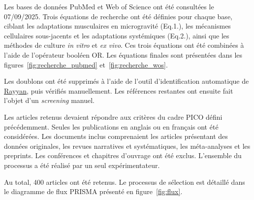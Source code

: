 \documentclass[11pt]{report}
\begin{document}
Les bases de données PubMed et Web of Science ont été consultées le 07/09/2025. Trois équations de recherche ont été définies pour chaque base, ciblant les adaptations musculaires en microgravité (Eq.1.), les mécanismes cellulaires sous-jacents et les adaptations systémiques (Eq.2.), ainsi que les méthodes de culture \textit{in vitro} et \textit{ex vivo}. Ces trois équations ont été combinées à l'aide de l'opérateur booléen OR. Les équations finales sont présentées dans les figures~\ref{fig:recherche_pubmed} et~\ref{fig:recherche_wos}.

\medskip Les doublons ont été supprimés à l'aide de l'outil d'identification automatique de \href{https://www.rayyan.ai/}{Rayyan}, puis vérifiés manuellement. Les références restantes ont ensuite fait l'objet d'un \textit{screening} manuel.

Les articles retenus devaient répondre aux critères du cadre PICO défini précédemment. Seules les publications en anglais ou en français ont été considérées. Les documents inclus comprenaient les articles présentant des données originales, les revues narratives et systématiques, les méta-analyses et les preprints. Les conférences et chapitres d'ouvrage ont été exclus. L'ensemble du processus a été réalisé par un seul expérimentateur.

\medskip Au total, 400 articles ont été retenus. Le processus de sélection est détaillé dans le diagramme de flux PRISMA \parencite{prisma2020_flow} présenté en figure~\ref{fig:flux}.

\clearpage
\end{document}
